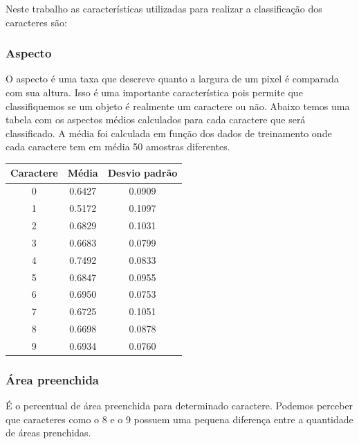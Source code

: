 \documentclass[letterpaper, 10 pt, conference]{ieeeconf}  %
\begin{document}
Neste trabalho as características utilizadas para realizar a classificação dos
caracteres são: 

\subsubsection{Aspecto}
O aspecto é uma taxa que descreve quanto a largura de um pixel é comparada com
sua altura. Isso é uma importante característica pois permite que classifiquemos
se um objeto é realmente um caractere ou não. Abaixo temos uma tabela com os
aspectos médios calculados para cada caractere que será classificado.
A média foi calculada em função dos dados de treinamento onde cada caractere tem
em média 50 amostras diferentes.



\begin{table}[h]
\centering
\begin{tabular}{|c|c|c|}
\hline
Caractere & Média  & Desvio padrão \\ \hline
0         & 0.6427 & 0.0909        \\ \hline
1         & 0.5172 & 0.1097        \\ \hline
2         & 0.6829 & 0.1031        \\ \hline
3         & 0.6683 & 0.0799        \\ \hline
4         & 0.7492 & 0.0833        \\ \hline
5         & 0.6847 & 0.0955        \\ \hline
6         & 0.6950 & 0.0753        \\ \hline
7         & 0.6725 & 0.1051        \\ \hline
8         & 0.6698 & 0.0878        \\ \hline
9         & 0.6934 & 0.0760        \\ \hline
\end{tabular}
\end{table}




\subsubsection{Área preenchida}
É o percentual de área preenchida para determinado caractere. Podemos perceber
que caracteres como o 8 e o 9 possuem uma pequena diferença entre a quantidade
de áreas prenchidas.
\end{document}
